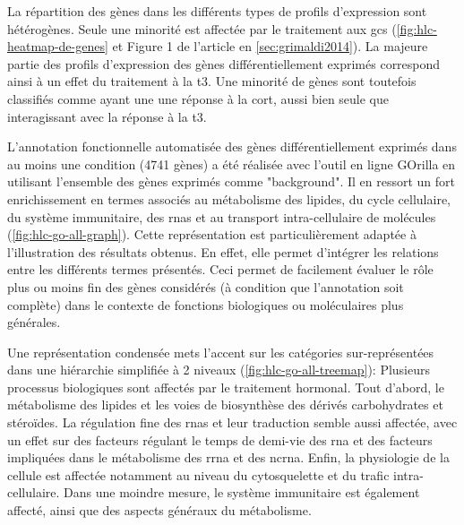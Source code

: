\documentclass[../main.tex]{subfiles}
\begin{document}
La répartition des gènes dans les différents types de profils d'expression sont hétérogènes.
Seule une minorité est affectée par le traitement aux \glspl{gc} (\autoref{fig:hlc-heatmap-de-genes} et Figure 1 de l'article en \autoref{sec:grimaldi2014}).
La majeure partie des profils d'expression des gènes différentiellement exprimés correspond ainsi à un effet du traitement à la \gls{t3}.
Une minorité de gènes sont toutefois classifiés comme ayant une une réponse à la \gls{cort}, aussi bien seule que interagissant avec la réponse à la \gls{t3}.



L'annotation fonctionnelle automatisée des gènes différentiellement exprimés dans au moins une condition (4741 gènes) a été réalisée avec l'outil en ligne GOrilla en utilisant l'ensemble des gènes exprimés comme "background".
Il en ressort un fort enrichissement en termes associés au métabolisme des lipides, du cycle cellulaire, du système immunitaire, des \glspl{rna} et au transport intra-cellulaire de molécules (\autoref{fig:hlc-go-all-graph}).
Cette représentation est particulièrement adaptée à l'illustration des résultats obtenus.
En effet, elle permet d'intégrer les relations entre les différents termes présentés.
Ceci permet de facilement évaluer le rôle plus ou moins fin des gènes considérés (à condition que l'annotation soit complète) dans le contexte de fonctions biologiques ou moléculaires plus générales.



Une représentation condensée mets l'accent sur les catégories sur-représentées dans une hiérarchie simplifiée à 2 niveaux (\autoref{fig:hlc-go-all-treemap}):
Plusieurs processus biologiques sont affectés par le traitement hormonal.
Tout d'abord, le métabolisme des lipides et les voies de biosynthèse des dérivés carbohydrates et stéroïdes.
La régulation fine des \glspl{rna} et leur traduction semble aussi affectée, avec un effet sur des facteurs régulant le temps de demi-vie des \gls{rna} et des facteurs impliquées dans le métabolisme des \gls{rrna} et des \gls{ncrna}.
Enfin, la physiologie de la cellule est affectée notamment au niveau du cytosquelette et du trafic intra-cellulaire.
Dans une moindre mesure, le système immunitaire est également affecté, ainsi que des aspects généraux du métabolisme.



\end{document}
